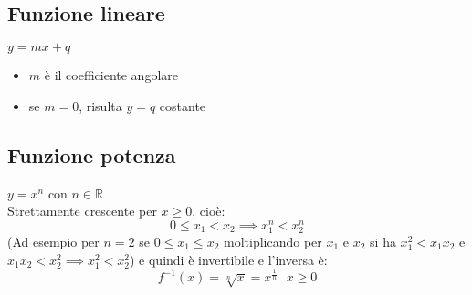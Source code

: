 \documentclass[../../main.tex]{subfiles}
\begin{document}
\subsection{Funzione lineare}
$y = mx + q$
\begin{itemize}
    \item $m$ è il coefficiente angolare
    \item se $m = 0$, risulta $y = q$ costante
\end{itemize}

\begin{center}
\end{center}

\subsection{Funzione potenza}
$y = x^n$ con $n \in \mathbb{R}$\\
Strettamente crescente per $x\geq 0$, cioè:
\[
    0 \leq x_1 < x_2 \implies x_1^n < x_2^n
\]
(Ad esempio per $n = 2$ se $0\leq x_1 \leq x_2$ moltiplicando per $x_1$ e $x_2$ si ha $x_1^2 < x_1x_2$ e $x_1x_2 < x_2^2 \implies x_1^2 < x_2^2$) e quindi è invertibile e l'inversa è:
\[
    f^{-1}(x) = \sqrt[n]{x} = x^{\frac{1}{n}} \ \ \ x \geq 0
\]
\end{document}

